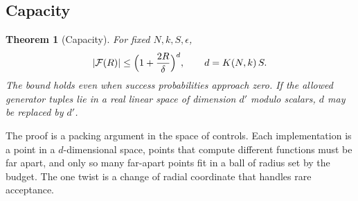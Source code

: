 \documentclass[11pt,a4paper]{article}
\newtheorem{theorem}{Theorem}
\begin{document}
\subsection{Capacity}

\begin{theorem}[Capacity]
\label{thm:capacity}
For fixed $N,k,S,\epsilon$,
\begin{equation}
 |\mathcal F(R)|\le\Bigl(1+\frac{2R}{\delta}\Bigr)^{d},\qquad d=K(N,k)\,S .
 \label{eq:capacity}
\end{equation}
The bound holds even when success probabilities approach zero. If the allowed generator tuples lie in a real linear space of dimension $d'$ modulo scalars, $d$ may be replaced by $d'$.
\end{theorem}

The proof is a packing argument in the space of controls. Each implementation is a point in a $d$-dimensional space, points that compute different functions must be far apart, and only so many far-apart points fit in a ball of radius set by the budget. The one twist is a change of radial coordinate that handles rare acceptance.
\end{document}
